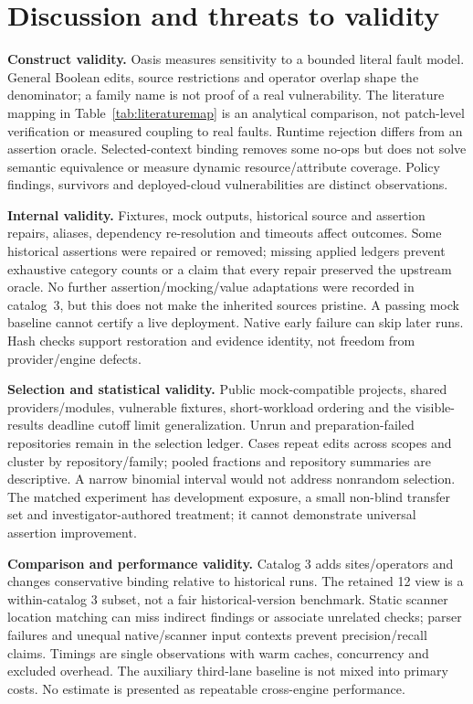 \section{Discussion and threats to validity}\label{sec:discussion}\label{sec:threats}
\textbf{Construct validity.} Oasis measures sensitivity to a bounded literal fault model. General Boolean edits, source restrictions and operator overlap shape the denominator; a family name is not proof of a real vulnerability. The literature mapping in Table~\ref{tab:literaturemap} is an analytical comparison, not patch-level verification or measured coupling to real faults. Runtime rejection differs from an assertion oracle. Selected-context binding removes some no-ops but does not solve semantic equivalence or measure dynamic resource/attribute coverage. Policy findings, survivors and deployed-cloud vulnerabilities are distinct observations.

\textbf{Internal validity.} Fixtures, mock outputs, historical source and assertion repairs, aliases, dependency re-resolution and timeouts affect outcomes. Some historical assertions were repaired or removed; missing applied ledgers prevent exhaustive category counts or a claim that every repair preserved the upstream oracle. No further assertion/mocking/value adaptations were recorded in catalog~3, but this does not make the inherited sources pristine. A passing mock baseline cannot certify a live deployment. Native early failure can skip later runs. Hash checks support restoration and evidence identity, not freedom from provider/engine defects.

\textbf{Selection and statistical validity.} Public mock-compatible projects, shared providers/modules, vulnerable fixtures, short-workload ordering and the visible-results deadline cutoff limit generalization. Unrun and preparation-failed repositories remain in the selection ledger. Cases repeat edits across scopes and cluster by repository/family; pooled fractions and repository summaries are descriptive. A narrow binomial interval would not address nonrandom selection. The matched experiment has development exposure, a small non-blind transfer set and investigator-authored treatment; it cannot demonstrate universal assertion improvement.

\textbf{Comparison and performance validity.} Catalog 3 adds sites/operators and changes conservative binding relative to historical runs. The retained 12 view is a within-catalog 3 subset, not a fair historical-version benchmark. Static scanner location matching can miss indirect findings or associate unrelated checks; parser failures and unequal native/scanner input contexts prevent precision/recall claims. Timings are single observations with warm caches, concurrency and excluded overhead. The auxiliary third-lane baseline is not mixed into primary costs. No estimate is presented as repeatable cross-engine performance.


